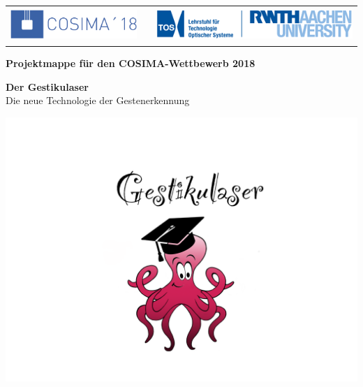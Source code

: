 
\begin{titlepage}

    
	\begin{table}[h!]
		\begin{tabular}{rp{5cm}l}
 		\includegraphics[height=1.25cm]{../Logos/Cosima18.png} & & \includegraphics[height=1.25cm]{../Logos/TOS.png} \\
		\end{tabular}
	\end{table}
    
    \small
	\parindent0pt
	
	\begin{center}
		\bfseries Projektmappe für den COSIMA-Wettbewerb 2018
	\end{center}
	
	\vspace*{15mm}
	\normalsize	
	
	\begin{center}
		\huge
		{\bfseries\sffamily Der Gestikulaser}
		\\ \vspace*{4mm}
		\large
		Die neue Technologie der Gestenerkennung
	\end{center}
	
	\vfill
	
	\begin{center}
	\large \mydate{\today}
	\end{center}
	
	\centering
	\includegraphics[scale=0.35]{../Logos/GestikulaserLogoBunt.png}
	\vfill
	

\end{titlepage}
